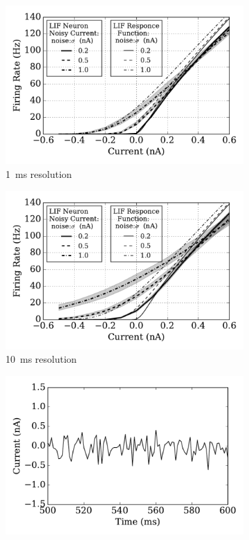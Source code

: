 	\begin{figure}
		\centering
		\begin{subfigure}[t]{0.49\textwidth}
			\includegraphics[width=\textwidth]{pics_iconip/2-1.pdf}
			\caption{1~ms resolution}
			\label{Fig:current-1}
		\end{subfigure}
		\begin{subfigure}[t]{0.49\textwidth}
			\includegraphics[width=\textwidth]{pics_iconip/2-10.pdf}
			\caption{10~ms resolution}
			\label{Fig:current-10}
		\end{subfigure}
		\begin{subfigure}[t]{0.49\textwidth}
			\includegraphics[width=\textwidth]{pics_iconip/curr_dt1.pdf}

\end{subfigure}
\end{figure}
